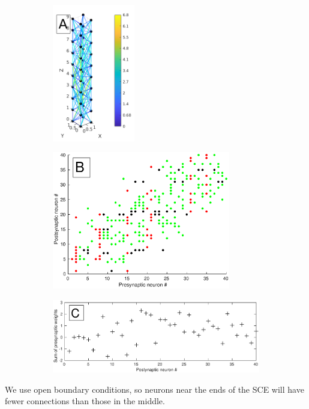 \documentclass[12pt]{article}
\begin{document}
\begin{figure}[!htb]
 \caption{Example SCE with dimensions 2x2x\color{red}10 (X/Y/Z)\color{black}, $\lambda$=2.5, and C=1. \color{red}A)\color{black}: SCE showing connections between neurons as lines colored using a color scale that indicates the connection length. 
 \color{red}B)\color{black}: Connection matrix. E-E connections are green, E-I are black and \color{red}both I-E and I-I \color{black} are red. 
 \color{red}C) The sum of presynaptic weights for each neuron shows the anisotropy of this model, with substantial variation in input strength and sign between the neuron inputs.\color{black}}
 \label{fig:column_structure}
 \begin{subfigure}{0.3\textwidth}
   \centering
   \includegraphics[height=60mm]{fig/column_structure_A}
 \end{subfigure}%
 \hfill
 \begin{subfigure}{0.7\textwidth}
   \centering
   \includegraphics[height=60mm]{fig/column_structure_B}
 \end{subfigure}%
 \hfill
 
  \begin{subfigure}{\textwidth}
   \centering
   \includegraphics[width=\textwidth]{fig/column_structure_C}
 \end{subfigure}%
\end{figure}
\color{red}
We use open boundary conditions, so neurons near the ends of the SCE will have fewer connections than those in the middle. 
\color{black}
\end{document}
